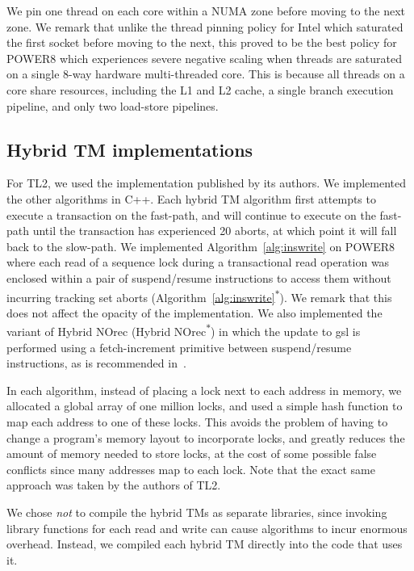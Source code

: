 We pin one thread on each core within a NUMA zone before moving to the next zone.
We remark that unlike the thread pinning policy for Intel which saturated the first socket before moving to the next, this proved to be the best policy
for POWER8 which experiences severe negative scaling when threads are saturated on a single 8-way hardware multi-threaded core.
This is because all threads on a core share resources, including the L1 and L2 cache, a single branch execution pipeline, 
and only two load-store pipelines.

\subsection{Hybrid TM implementations}
For TL2, we used the implementation published by its authors.
We implemented the other algorithms in C++.
Each hybrid TM algorithm first attempts to execute a transaction on the fast-path, and will continue to execute on the fast-path until the transaction has experienced 20 aborts, at which point it will fall back to the slow-path.
We implemented Algorithm~\ref{alg:inswrite} on POWER8 where each read of a sequence lock during a transactional read operation was enclosed within a pair of suspend/resume instructions to access them without 
incurring tracking set aborts (Algorithm~\ref{alg:inswrite}\textsuperscript{$\ast$}). We remark that this does not affect the opacity of the implementation. 
We also implemented the variant of Hybrid NOrec (Hybrid NOrec\textsuperscript{$\ast$}) in which the update to gsl is performed using a fetch-increment primitive between suspend/resume instructions, as is recommended in~\cite{hynorecriegel}.

In each algorithm, instead of placing a lock next to each address in memory, we allocated a global array of one million locks, and used a simple hash function to map each address to one of these locks.
This avoids the problem of having to change a program's memory layout to incorporate locks, and greatly reduces the amount of memory needed to store locks, at the cost of some possible false conflicts since many addresses map to each lock.
Note that the exact same approach was taken by the authors of TL2.

We chose \textit{not} to compile the hybrid TMs as separate libraries, since invoking library functions for each read and write can cause algorithms to incur enormous overhead.
Instead, we compiled each hybrid TM directly into the code that uses it.

